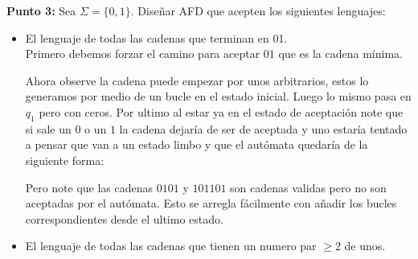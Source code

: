 \textbf{Punto 3: }Sea $\Sigma=\{0,1\}.$ Diseñar AFD que acepten los siguientes lenguajes:
\begin{itemize}[label={$\bullet$}]
    \item El lenguaje de todas las cadenas que terminan en 01.\\

     Primero debemos forzar el camino para aceptar $01$ que es la cadena mínima.
    \begin{basedtikz}
    \centering
    \end{basedtikz}
    Ahora observe la cadena puede empezar por unos arbitrarios, estos lo generamos por medio de un bucle en el estado inicial. Luego lo mismo pasa en $q_1$ pero con ceros. Por ultimo al estar ya en el estado de aceptación note que si sale un $0$ o un $1$ la cadena dejaría de ser de aceptada y uno estaría tentado a pensar que van a un estado limbo y que el autómata quedaría de la siguiente forma:
    \begin{basedtikz}
    \centering
    \end{basedtikz}
Pero note que las cadenas $0101$ y $101101$ son cadenas validas pero no son aceptadas por el autómata. Esto se arregla fácilmente con añadir los bucles correspondientes desde el ultimo estado.
    \begin{basedtikz}
    \centering
        \end{basedtikz}
        \item El lenguaje de todas las cadenas que tienen un numero par $\geq2$ de unos.\\


\end{itemize}
